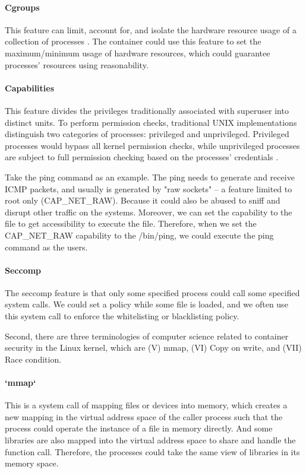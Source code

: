 \documentclass[12pt,a4paper]{article}
\begin{document}
\paragraph{Cgroups}
This feature can limit, account for, and isolate the hardware resource usage of a
collection of processes \cite{cgroup_wiki}.
The container could use this feature to set the maximum/minimum usage of hardware
resources, which could guarantee processes' resources using reasonability.

\paragraph{Capabilities}
This feature divides the privileges traditionally associated with superuser into
distinct units. To perform permission checks, traditional UNIX
implementations distinguish two categories of processes: privileged and unprivileged.
Privileged processes would bypass all kernel permission checks, while unprivileged
processes are subject to full permission checking based on the processes' credentials
\cite{capabilities}.

Take the ping command as an example. The ping needs to generate and receive ICMP packets,
and usually is generated by "raw sockets" – a feature limited to root only
(CAP\_NET\_RAW). Because it could also be abused to sniff and disrupt other traffic
on the systems. Moreover, we can set the capability to the file to get accessibility
to execute the file.
Therefore, when we set the CAP\_NET\_RAW capability to the /bin/ping, we could execute
the ping command as the users.

\paragraph{Seccomp}
The seccomp feature is that only some specified process could call some specified
system calls. We could set a policy while some file is loaded, and we often use
this system call to enforce the whitelisting or blacklisting policy.

Second, there are three terminologies of computer science related to container
security in the Linux kernel, which are (\RN{5}) mmap, (\RN{6}) Copy on write,
and (\RN{7}) Race condition.

\paragraph{`mmap`}
This is a system call of mapping files or devices into memory, which creates a
new mapping in the virtual address space of the caller process such that
the process could operate the instance of a file in memory directly.
And some libraries are also mapped into the virtual address space to share and handle
the function call. Therefore, the processes could take the same view of libraries in
its memory space.
\end{document}
